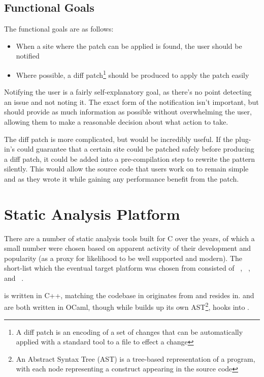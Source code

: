 \subsection{Functional Goals}

The functional goals are as follows:

\begin{itemize}
	\item When a site where the patch can be applied is found, the user should be notified
	\item Where possible, a diff patch\footnote{A diff patch is an encoding of a set of changes that can be automatically applied with a standard tool to a file to effect a change} should be produced to apply the patch easily
\end{itemize}

Notifying the user is a fairly self-explanatory goal, as there's no point detecting an issue and not noting it. The exact form of the notification isn't important, but should provide as much information as possible without overwhelming the user, allowing them to make a reasonable decision about what action to take.

The diff patch is more complicated, but would be incredibly useful. If the plug-in's could guarantee that a certain site could be patched safely before producing a diff patch, it could be added into a pre-compilation step to rewrite the pattern silently. This would allow the source code that users work on to remain simple and as they wrote it while gaining any performance benefit from the patch.

\section{Static Analysis Platform}

There are a number of static analysis tools built for C over the years, of which a small number were chosen based on apparent activity of their development and popularity (as a proxy for likelihood to be well supported and modern). The short-list which the eventual target platform was chosen from consisted of ~\cite{clang-analyzer}, ~\cite{frama}, and ~\cite{fbinfer}.

 is written in C++, matching the  codebase in originates from and resides in.  and  are both written in OCaml, though while  builds up its own AST\footnote{An Abstract Syntax Tree (AST) is a tree-based representation of a program, with each node representing a construct appearing in the source code},  hooks into .


